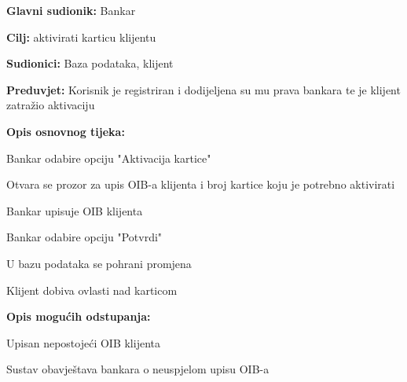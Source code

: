             
            	\noindent {}
            	\begin{packed_item}
            		
            		\item \textbf{Glavni sudionik: }Bankar
            		\item  \textbf{Cilj:} aktivirati karticu klijentu
            		\item  \textbf{Sudionici:} Baza podataka, klijent
            		\item  \textbf{Preduvjet:} Korisnik je registriran i dodijeljena su mu prava bankara te je klijent zatražio aktivaciju
            		\item  \textbf{Opis osnovnog tijeka:}
            		
            		\item[] \begin{packed_enum}
            			
            			\item Bankar odabire opciju "Aktivacija kartice"
            			\item Otvara se prozor za upis OIB-a klijenta i broj kartice koju je potrebno aktivirati
            			\item Bankar upisuje OIB klijenta 
            			\item Bankar odabire opciju "Potvrdi"
            			\item U bazu podataka se pohrani promjena 
            			\item Klijent dobiva ovlasti nad karticom
            		\end{packed_enum}
            		
            		\item  \textbf{Opis mogućih odstupanja:} 
            		
            		\item[] \begin{packed_item}
            			
            			\item[2.a] Upisan nepostojeći OIB klijenta
            			\item[] \begin{packed_enum}
            				
            				\item Sustav obavještava bankara o neuspjelom upisu OIB-a
            				
            			\end{packed_enum}
            			
            		\end{packed_item}
            	\end{packed_item}
                
